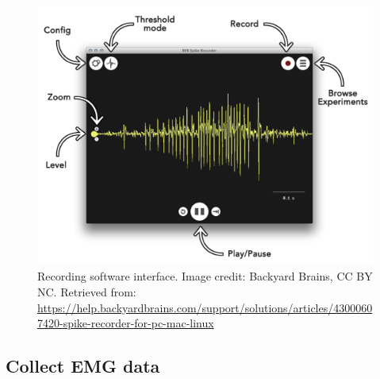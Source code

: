 \documentclass{article}
\begin{document}
\begin{figure}[!htbp]
\centering
\includegraphics[width=0.9\linewidth]{files/EPpXta8zJdzN048lz8AR-489a1f469b32eb1f15edddc5d0ab4c71.png}
\caption[]{Recording software interface. Image credit: Backyard Brains, CC BY NC. Retrieved from: \href{https://help.backyardbrains.com/support/solutions/articles/43000607420-spike-recorder-for-pc-mac-linux}{https://help.backyardbrains.com/support/solutions/articles/43000607420-spike-recorder-for-pc-mac-linux}}
\label{DAnQ9yMs5v}
\end{figure}

\subsection{Collect EMG data}
\end{document}
